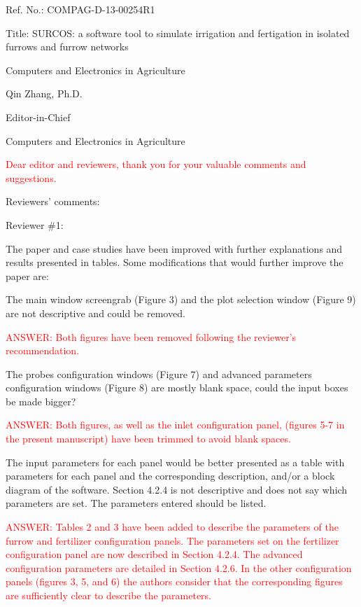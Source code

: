 \documentclass[a4paper]{article}
\begin{document}
Ref. No.:  COMPAG-D-13-00254R1

Title: SURCOS: a software tool to simulate irrigation and fertigation in isolated furrows and furrow networks

Computers and Electronics in Agriculture

Qin Zhang, Ph.D.

Editor-in-Chief

Computers and Electronics in Agriculture

\textcolor{red}{Dear editor and reviewers, thank you for your valuable comments
and suggestions.}

\vspace{5mm}

Reviewers' comments:

\vspace{5mm}

Reviewer \#1:

The paper and case studies have been improved with further explanations and results presented in tables. Some modifications that would further improve the paper are:

The main window screengrab (Figure 3) and the plot selection window (Figure 9) are not descriptive and could be removed.

\textcolor{red}{ANSWER: Both figures have been removed following the reviewer's recommendation.}

The probes configuration windows (Figure 7) and advanced parameters configuration windows (Figure 8) are mostly blank space, could the input boxes be made bigger? 

\textcolor{red}{ANSWER: Both figures, as well as the inlet configuration panel, (figures 5-7 in the present manuscript) have been trimmed to avoid blank spaces.} 

The input parameters for each panel would be better presented as a table with parameters for each panel and the corresponding description, and/or a block diagram of the software. 
Section 4.2.4 is not descriptive and does not say which parameters are set. The parameters entered should be listed.


\textcolor{red}{ANSWER: Tables 2 and 3 have been added to describe the parameters of the furrow and fertilizer configuration panels. The parameters set on the
fertilizer configuration panel are now described in Section 4.2.4. The advanced configuration parameters are detailed in Section 4.2.6. In the other configuration panels (figures 3, 5, and 6) the authors consider that the corresponding figures are sufficiently clear to describe the parameters.}
\end{document}
